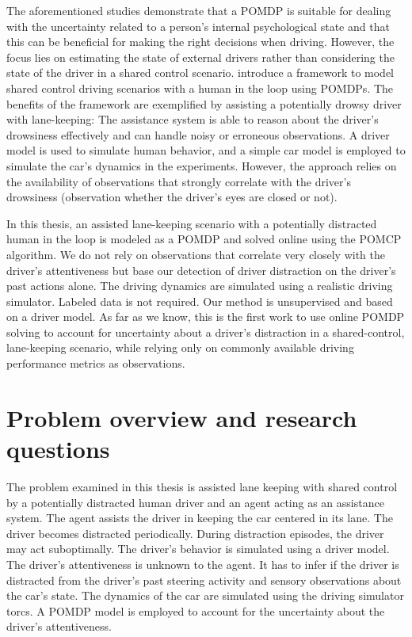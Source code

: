 The aforementioned studies demonstrate that a POMDP is suitable for dealing with the uncertainty related to a person's internal psychological state and that this can be beneficial for making the right decisions when driving. However, the focus lies on estimating the state of external drivers rather than considering the state of the driver in a shared control scenario. \cite{hitl_pomdp} introduce a framework to model shared control driving scenarios with a human in the loop using POMDPs. The benefits of the framework are exemplified by assisting a potentially drowsy driver with lane-keeping: The assistance system is able to reason about the driver's drowsiness effectively and can handle noisy or erroneous observations. A driver model is used to simulate human behavior, and a simple car model is employed to simulate the car's dynamics in the experiments. However, the approach relies on the availability of observations that strongly correlate with the driver's drowsiness (observation whether the driver's eyes are closed or not).

In this thesis, an assisted lane-keeping scenario with a potentially distracted human in the loop is modeled as a POMDP and solved online using the POMCP algorithm. We do not rely on observations that correlate very closely with the driver's attentiveness but base our detection of driver distraction on the driver's past actions alone. The driving dynamics are simulated using a realistic driving simulator. Labeled data is not required. Our method is unsupervised and based on a driver model. As far as we know, this is the first work to use online POMDP solving to account for uncertainty about a driver's distraction in a shared-control, lane-keeping scenario, while relying only on commonly available driving performance metrics as observations.

\section{Problem overview and research questions}

The problem examined in this thesis is assisted lane keeping with shared control by a potentially distracted human driver and an agent acting as an assistance system. The agent assists the driver in keeping the car centered in its lane. The driver becomes distracted periodically. During distraction episodes, the driver may act suboptimally. The driver's behavior is simulated using a driver model. The driver’s attentiveness is unknown to the agent. It has to infer if the driver is distracted from the driver's past steering activity and sensory observations about the car's state. The dynamics of the car are simulated using the driving simulator \Gls{torcs}. A POMDP model is employed to account for the uncertainty about the driver's attentiveness.

